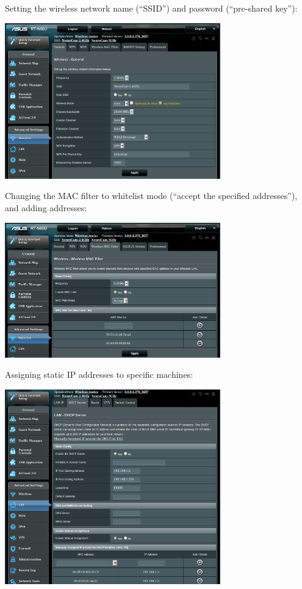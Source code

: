 \clearpage
Setting the wireless network name (``SSID'') and password (``pre-shared 
key''):
\begin{center}
\includegraphics[width=0.7\textwidth]
{pics-router/asus-n66u-ssid.png}
\end{center}

Changing the MAC filter to whitelist mode (``accept the specified 
addresses''), and adding addresses:
\begin{center}
\includegraphics[width=0.7\textwidth]
{pics-router/asus-n66u-macfilter.png}
\end{center}

\clearpage
Assigning static IP addresses to specific machines:
\begin{center}
\includegraphics[width=0.7\textwidth]
{pics-router/asus-n66u-static.png}
\end{center}

